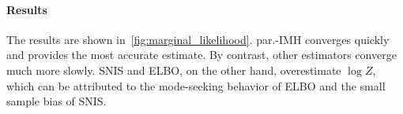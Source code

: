 %
  \vspace{-0.2in}
\paragraph{Results}
The results are shown in~\cref{fig:marginal_likelihood}.
par.-IMH converges quickly and provides the most accurate estimate.
By contrast, other estimators converge much more slowly.
SNIS and ELBO, on the other hand, overestimate \(\log Z\), which can be attributed to the mode-seeking behavior of ELBO and the small sample bias of SNIS.


